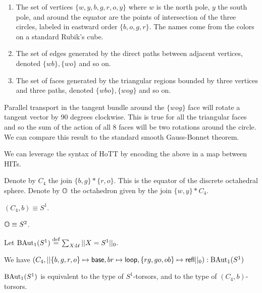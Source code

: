 \documentclass[12pt]{article}
\begin{document}
\begin{enumerate}
\item The set of vertices \( \{w, y, b, g, r, o, y\} \) where \( w \) is the north pole, \( y \) the south pole, and around the equator are the points of intersection of the three circles, labeled in eastward order \( \{b, o, g, r\} \). The names come from the colors on a standard Rubik's cube.
\item The set of edges generated by the direct paths between adjacent vertices, denoted \( \{wb\}, \{wo\}  \) and so on.
\item The set of faces generated by the triangular regions bounded by three vertices and three paths, denoted \( \{wbo\}, \{wog\} \) and so on.
\end{enumerate}

Parallel transport in the tangent bundle around the \( \{wog\} \) face will rotate a tangent vector by 90 degrees clockwise. This is true for all the triangular faces and so the sum of the action of all 8 faces will be two rotations around the circle. We can compare this result to the standard smooth Gauss-Bonnet theorem.

We can leverage the syntax of HoTT by encoding the above in a map between HITs.

\begin{mydef}
Denote by \( C_4 \) the join \( \{b, g\}*\{r, o\} \). This is the equator of the discrete octahedral sphere. Denote by \( \mathbb{O} \) the octahedron given by the join \( \{w, y\}* C_4 \).
\end{mydef}

\begin{mylemma}
\( (C_4, b)\equiv S^1 \).
\end{mylemma}

\begin{mylemma}
\( \mathbb{O}\equiv S^2 \).
\end{mylemma}

\begin{mydef}
Let \( \mathrm{BAut}_1(S^1)\stackrel{\textup{def}}{=} \sum_{X:\mathcal{U}}||X=S^1||_0. \)
\end{mydef}

\begin{mylemma}
We have \( (C_4, ||\{b, g, r, o\}\mapsto \mathsf{base}, br\mapsto \mathsf{loop}, \{rg, go, ob\}\mapsto \mathsf{refl} ||_0):\mathrm{BAut}_1(S^1) \)
\end{mylemma}

\begin{mylemma}
\( \mathrm{BAut}_1(S^1) \) is equivalent to the type of \( S^1 \)-torsors, and to the type of \( (C_4,b) \)-torsors.
\end{mylemma}
\end{document}
